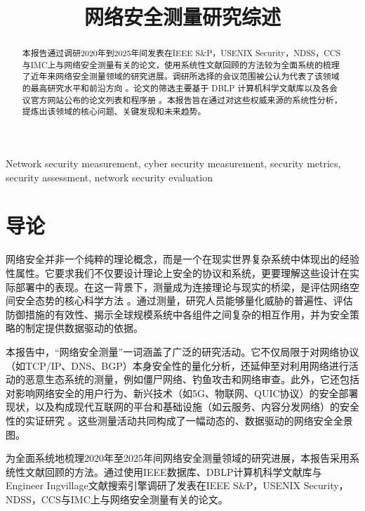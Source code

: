 \documentclass[conference]{IEEEtran}
\begin{document}
\title{网络安全测量研究综述}

\author{
}

\maketitle

\begin{abstract}
本报告通过调研2020年到2025年间发表在IEEE S\&P，USENIX Security，NDSS，CCS与IMC上与网络安全测量有关的论文，使用系统性文献回顾的方法较为全面系统的梳理了近年来网络安全测量领域的研究进展。调研所选择的会议范围被公认为代表了该领域的最高研究水平和前沿方向 。论文的筛选主要基于 DBLP 计算机科学文献库以及各会议官方网站公布的论文列表和程序册 。本报告旨在通过对这些权威来源的系统性分析，提炼出该领域的核心问题、关键发现和未来趋势。
\end{abstract}

\begin{IEEEkeywords}
Network security measurement, cyber security measurement, security metrics, security assessment, network security evaluation
\end{IEEEkeywords}



\section{导论}
网络安全并非一个纯粹的理论概念，而是一个在现实世界复杂系统中体现出的经验性属性。它要求我们不仅要设计理论上安全的协议和系统，更要理解这些设计在实际部署中的表现。在这一背景下，测量成为连接理论与现实的桥梁，是评估网络空间安全态势的核心科学方法 。通过测量，研究人员能够量化威胁的普遍性、评估防御措施的有效性、揭示全球规模系统中各组件之间复杂的相互作用，并为安全策略的制定提供数据驱动的依据。

本报告中，“网络安全测量”一词涵盖了广泛的研究活动。它不仅局限于对网络协议（如TCP/IP、DNS、BGP）本身安全性的量化分析，还延伸至对利用网络进行活动的恶意生态系统的测量，例如僵尸网络、钓鱼攻击和网络审查。此外，它还包括对影响网络安全的用户行为、新兴技术（如5G、物联网、QUIC协议）的安全部署现状，以及构成现代互联网的平台和基础设施（如云服务、内容分发网络）的安全性的实证研究 。这些测量活动共同构成了一幅动态的、数据驱动的网络安全全景图。

为全面系统地梳理2020年至2025年间网络安全测量领域的研究进展，本报告采用系统性文献回顾的方法。通过使用IEEE数据库、DBLP计算机科学文献库与Engineer Ingvillage文献搜索引擎调研了发表在IEEE S\&P，USENIX Security，NDSS，CCS与IMC上与网络安全测量有关的论文。
\end{document}
